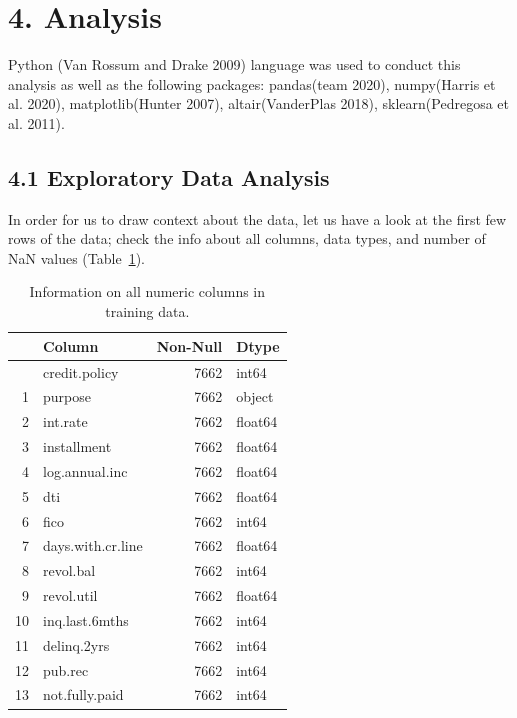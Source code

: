 \documentclass[
  letterpaper,
  DIV=11,
  numbers=noendperiod]{scrartcl}
\begin{document}
\section{\texorpdfstring{4. Analysis }{4. Analysis  }}\label{analysis}

Python (Van Rossum and Drake 2009) language was used to conduct this
analysis as well as the following packages: pandas(team 2020),
numpy(Harris et al. 2020), matplotlib(Hunter 2007), altair(VanderPlas
2018), sklearn(Pedregosa et al. 2011).

\subsection{4.1 Exploratory Data
Analysis}\label{exploratory-data-analysis}

In order for us to draw context about the data, let us have a look at
the first few rows of the data; check the info about all columns, data
types, and number of NaN values (Table~\ref{tbl-info}).

\begin{longtable}[]{@{}rlrl@{}}

\caption{\label{tbl-info}Information on all numeric columns in training
data.}

\tabularnewline

\toprule\noalign{}
& Column & Non-Null & Dtype \\
\midrule\noalign{}
\endhead
\bottomrule\noalign{}
\endlastfoot
0 & credit.policy & 7662 & int64 \\
1 & purpose & 7662 & object \\
2 & int.rate & 7662 & float64 \\
3 & installment & 7662 & float64 \\
4 & log.annual.inc & 7662 & float64 \\
5 & dti & 7662 & float64 \\
6 & fico & 7662 & int64 \\
7 & days.with.cr.line & 7662 & float64 \\
8 & revol.bal & 7662 & int64 \\
9 & revol.util & 7662 & float64 \\
10 & inq.last.6mths & 7662 & int64 \\
11 & delinq.2yrs & 7662 & int64 \\
12 & pub.rec & 7662 & int64 \\
13 & not.fully.paid & 7662 & int64 \\

\end{longtable}
\end{document}
